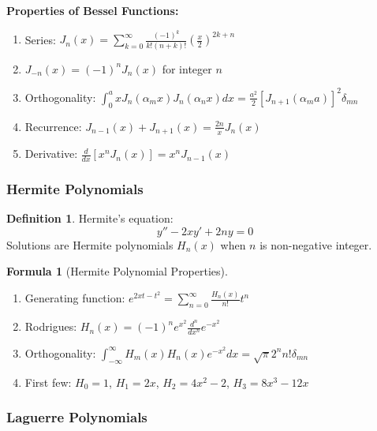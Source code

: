 \documentclass[12pt,a4paper]{article}
\theoremstyle{definition}
\newtheorem{definition}[theorem]{Definition}
\newtheorem{formula}[theorem]{Formula}
\begin{document}
\begin{importantbox}
\textbf{Properties of Bessel Functions:}
\begin{enumerate}
    \item Series: $J_n(x) = \sum_{k=0}^{\infty} \frac{(-1)^k}{k!(n+k)!}\left(\frac{x}{2}\right)^{2k+n}$
    
    \item $J_{-n}(x) = (-1)^n J_n(x)$ for integer $n$
    
    \item Orthogonality: $\int_0^a xJ_n(\alpha_m x)J_n(\alpha_n x)dx = \frac{a^2}{2}[J_{n+1}(\alpha_m a)]^2\delta_{mn}$
    
    \item Recurrence: $J_{n-1}(x) + J_{n+1}(x) = \frac{2n}{x}J_n(x)$
    
    \item Derivative: $\frac{d}{dx}[x^n J_n(x)] = x^n J_{n-1}(x)$
\end{enumerate}
\end{importantbox}

\subsubsection{Hermite Polynomials}

\begin{definition}
Hermite's equation:
\[
y'' - 2xy' + 2ny = 0
\]
Solutions are Hermite polynomials $H_n(x)$ when $n$ is non-negative integer.
\end{definition}

\begin{formula}[Hermite Polynomial Properties]
\begin{enumerate}
    \item Generating function: $e^{2xt - t^2} = \sum_{n=0}^{\infty} \frac{H_n(x)}{n!}t^n$
    
    \item Rodrigues: $H_n(x) = (-1)^n e^{x^2}\frac{d^n}{dx^n}e^{-x^2}$
    
    \item Orthogonality: $\int_{-\infty}^{\infty} H_m(x)H_n(x)e^{-x^2}dx = \sqrt{\pi}2^n n!\delta_{mn}$
    
    \item First few: $H_0 = 1$, $H_1 = 2x$, $H_2 = 4x^2 - 2$, $H_3 = 8x^3 - 12x$
\end{enumerate}
\end{formula}

\subsubsection{Laguerre Polynomials}
\end{document}
